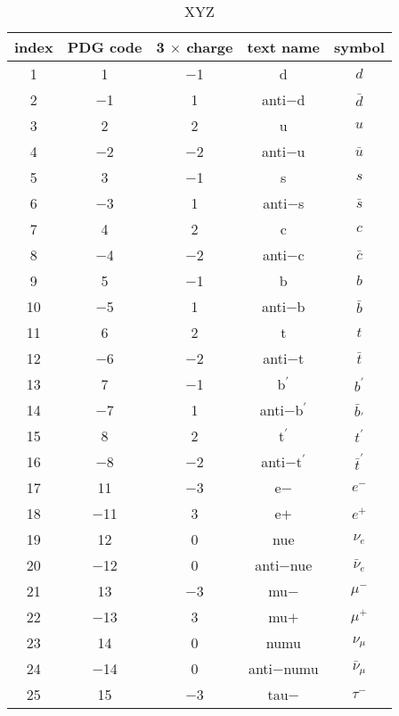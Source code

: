 \documentclass{article}
\begin{document}
\begin{table}[!htbp]
\centering
\caption{XYZ}
\begin{tabular}{|c|c|c|c|c|}
\hline
index & PDG code & 3 $\times$ charge & text name & symbol \\
\hline
1 & 1 & $-$1 & d & $d$ \\
\hline
2 & $-$1 & 1 & anti$-$d & $\bar{d}$ \\
\hline
3 & 2 & 2 & u & $u$ \\
\hline
4 & $-$2 & $-$2 & anti$-$u & $\bar{u}$ \\
\hline
5 & 3 & $-$1 & s & $s$ \\
\hline
6 & $-$3 & 1 & anti$-$s & $\bar{s}$ \\
\hline
7 & 4 & 2 & c & $c$ \\
\hline
8 & $-$4 & $-$2 & anti$-$c & $\bar{c}$ \\
\hline
9 & 5 & $-$1 & b & $b$ \\
\hline
10 & $-$5 & 1 & anti$-$b & $\bar{b}$ \\
\hline
11 & 6 & 2 & t & $t$ \\
\hline
12 & $-$6 & $-$2 & anti$-$t & $\bar{t}$ \\
\hline
13 & 7 & $-$1 & b$^{\prime}$ & $b^{\prime}$ \\
\hline
14 & $-$7 & 1 & anti$-$b$^{\prime}$ & $\bar{b}_{\prime}$ \\
\hline
15 & 8 & 2 & t$^{\prime}$ & $t^{\prime}$ \\
\hline
16 & $-$8 & $-$2 & anti$-$t$^{\prime}$ & $\bar{t}^{\prime}$ \\
\hline
17 & 11 & $-$3 & e$-$ & $e^{-}$ \\
\hline
18 & $-$11 & 3 & e$+$ & $e^{+}$ \\
\hline
19 & 12 & 0 & nu\underline{\hspace{0.6em}}e & $\nu_{e}$ \\
\hline
20 & $-$12 & 0 & anti$-$nu\underline{\hspace{0.6em}}e & $\bar{\nu}_{e}$ \\
\hline
21 & 13 & $-$3 & mu$-$ & $\mu^{-}$ \\
\hline
22 & $-$13 & 3 & mu$+$ & $\mu^{+}$ \\
\hline
23 & 14 & 0 & nu\underline{\hspace{0.6em}}mu & $\nu_{\mu}$ \\
\hline
24 & $-$14 & 0 & anti$-$nu\underline{\hspace{0.6em}}mu & $\bar{\nu}_{\mu}$ \\
\hline
25 & 15 & $-$3 & tau$-$ & $\tau^{-}$ \\

\end{tabular}
\end{table}
\end{document}
